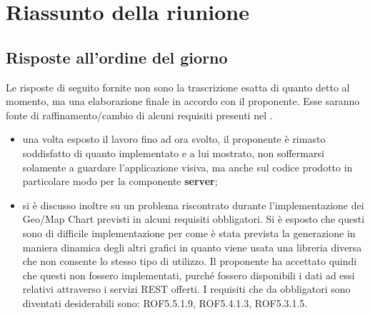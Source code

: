 %


\section{Riassunto della riunione} %
\label{sec:riassunto_della_riunione}

\subsection{Risposte all'ordine del giorno}
Le risposte di seguito fornite non sono la trascrizione esatta di quanto detto al momento, ma una elaborazione finale in accordo con il proponente. \newline
Esse saranno fonte di raffinamento/cambio di alcuni requisiti presenti nel \docNameVersionAdR.

\begin{itemize}
  	\item una volta esposto il lavoro fino ad ora svolto, il proponente è rimasto soddisfatto di quanto implementato e a lui mostrato, non soffermarsi solamente a guardare l'applicazione visiva, ma anche sul codice prodotto in particolare modo per la componente \textbf{server};
	\item si è discusso inoltre su un problema riscontrato durante l'implementazione dei Geo/Map Chart previsti in alcuni requisiti obbligatori. Si è esposto che questi sono di difficile implementazione per come è stata prevista la generazione in maniera dinamica degli altri grafici in quanto viene usata una libreria diversa che non consente lo stesso tipo di utilizzo. Il proponente ha accettato quindi che questi non fossero implementati, purché fossero disponibili i dati ad essi relativi attraverso i servizi REST offerti. \newline
	I requisiti che da obbligatori sono diventati desiderabili sono: ROF5.5.1.9, ROF5.4.1.3, ROF5.3.1.5.
\end{itemize}
